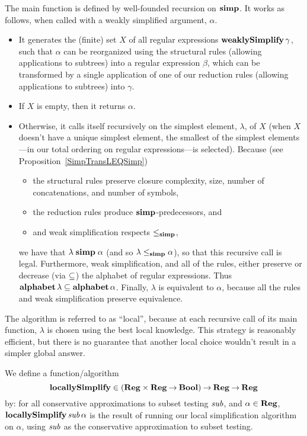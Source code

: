 The main function is defined by well-founded recursion on $\mathrel{\mathbf{simp}}$.  It
works as follows, when called with a weakly simplified argument,
$\alpha$.
\begin{itemize}
\item It generates the (finite) set $X$ of all regular expressions
  $\mathbf{weaklySimplify}\,\gamma$, such that $\alpha$ can be reorganized
  using the structural rules (allowing applications to subtrees) into
  a regular expression $\beta$, which can be transformed by a single
  application of one of our reduction rules (allowing applications to
  subtrees) into $\gamma$.

\item If $X$ is empty, then it returns $\alpha$.

\item Otherwise, it calls itself recursively on the simplest element,
  $\lambda$, of $X$ (when $X$ doesn't have a unique simplest element,
  the smallest of the simplest elements---in our total ordering on
  regular expressions---is selected).  Because (see
  Proposition~\ref{SimpTransLEQSimp})
  \begin{itemize}
  \item the structural rules preserve closure complexity, size, number
    of concatenations, and number of symbols,

  \item the reduction rules produce $\mathrel{\mathbf{simp}}$-predecessors, and

  \item and weak simplification respects $\mathrel{\leq_{\mathbf{simp}}}$,
  \end{itemize}
  we have that $\lambda\mathrel{\mathbf{simp}}\alpha$ (and so $\lambda\mathrel{\leq_{\mathbf{simp}}}\alpha$),
  so that this recursive call is legal.  Furthermore, weak
  simplification, and all of the rules, either preserve or decrease
  (via $\subseteq$) the alphabet of regular expressions.  Thus
  $\mathbf{alphabet}\,\lambda\subseteq\mathbf{alphabet}\,\alpha$. Finally, $\lambda$ is
  equivalent to $\alpha$, because all the rules and weak simplification
  preserve equivalence.
\end{itemize}

The algorithm is referred to as ``local'', because at each recursive
call of its main function, $\lambda$ is chosen using the best local
knowledge.  This strategy is reasonably efficient, but there is no
guarantee that another local choice wouldn't result in a simpler
global answer.

We define a function/algorithm
%
\begin{displaymath}
\mathbf{locallySimplify}\in(\mathbf{Reg}\times\mathbf{Reg}\mathbin{\to}\mathbf{Bool})\mathbin{\to}\mathbf{Reg}\mathbin{\to}\mathbf{Reg}
\end{displaymath}
by: for all conservative approximations to subset testing ${\it sub}$, and
$\alpha\in\mathbf{Reg}$, $\mathbf{locallySimplify}\,{\it sub}\,\alpha$ is the result of
running our local simplification algorithm on $\alpha$, using ${\it sub}$
as the conservative approximation to subset testing.

